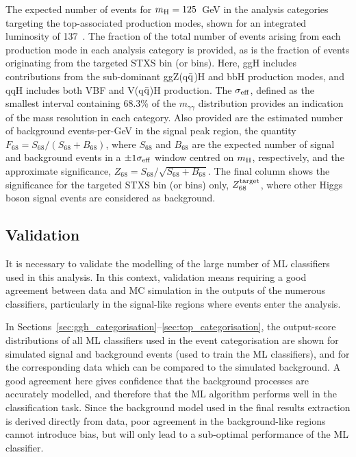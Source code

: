 \begin{table}
    \caption[Expected yields for the top-associated production mode categories]{The expected number of events for $m_{\rm{H}}=125$~GeV in the analysis categories targeting the top-associated production modes, shown for an integrated luminosity of 137~\fbinv. The fraction of the total number of events arising from each production mode in each analysis category is provided, as is the fraction of events originating from the targeted STXS bin (or bins). Here, ggH includes contributions from the sub-dominant ggZ(q$\bar{\rm{q}}$)H and bbH production modes, and qqH includes both VBF and V(q$\bar{\rm{q}}$)H production. The $\sigma_{\rm{eff}}$, defined as the smallest interval containing 68.3\% of the $m_{\gamma\gamma}$ distribution provides an indication of the mass resolution in each category. Also provided are the estimated number of background events-per-GeV in the signal peak region, the quantity $F_{68}=S_{68}/(S_{68}+B_{68})$, where $S_{68}$ and $B_{68}$ are the expected number of signal and background events in a $\pm1\sigma_{\rm{eff}}$ window centred on $m_{\rm{H}}$, respectively, and the approximate significance, $Z_{68}=S_{68}/\sqrt{S_{68}+B_{68}}$. The final column shows the significance for the targeted STXS bin (or bins) only, $Z^{\rm{target}}_{68}$,  where other Higgs boson signal events are considered as background.}
    \label{tab:top_category_yields}
    \centering
    \scriptsize
    \renewcommand{\arraystretch}{1.2}
    \setlength{\tabcolsep}{3pt}
    \hspace*{-1.5cm}
    
    \hspace*{-1.5cm}
\end{table}


\subsection{Validation}\label{sec:cat_validation}
It is necessary to validate the modelling of the large number of ML classifiers used in this analysis. In this context, validation means requiring a good agreement between data and MC simulation in the outputs of the numerous classifiers, particularly in the signal-like regions where events enter the analysis. 

In Sections~\ref{sec:ggh_categorisation}--\ref{sec:top_categorisation}, the output-score distributions of all ML classifiers used in the event categorisation are shown for simulated signal and background events (used to train the ML classifiers), and for the corresponding data which can be compared to the simulated background. A good agreement here gives confidence that the background processes are accurately modelled, and therefore that the ML algorithm performs well in the classification task. Since the background model used in the final results extraction is derived directly from data, poor agreement in the background-like regions cannot introduce bias, but will only lead to a sub-optimal performance of the ML classifier. 

